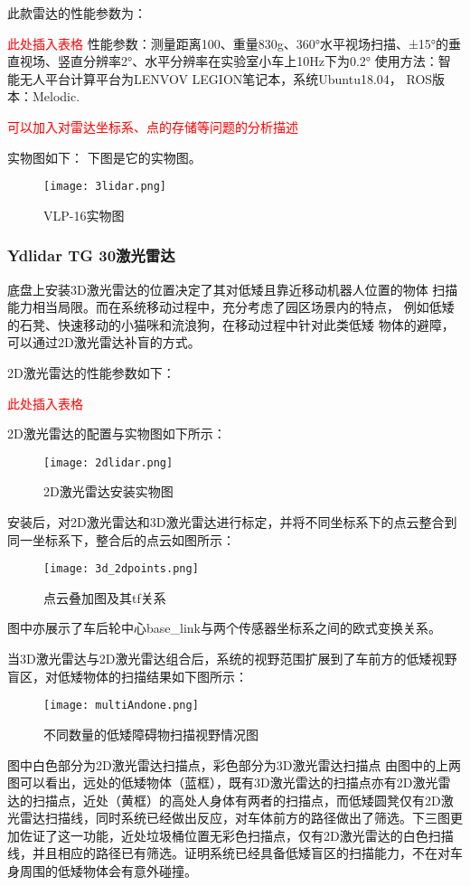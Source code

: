此款雷达的性能参数为：

\textcolor{red}{此处插入表格}
性能参数：测量距离100、重量830g、360°水平视场扫描、±15°的垂直视场、竖直分辨率2°、水平分辨率在实验室小车上10Hz下为0.2°
使用方法：智能无人平台计算平台为LENVOV LEGION笔记本，系统Ubuntu18.04， ROS版本：Melodic.

\textcolor{red}{可以加入对雷达坐标系、点的存储等问题的分析描述}

实物图如下：
下图是它的实物图。

\begin{figure}[ht]
    \centering
    \texttt{[image: 3lidar.png]}
    \caption{VLP-16实物图}
\end{figure}

\subsubsection{Ydlidar TG 30激光雷达}
底盘上安装3D激光雷达的位置决定了其对低矮且靠近移动机器人位置的物体
扫描能力相当局限。而在系统移动过程中，充分考虑了园区场景内的特点，
例如低矮的石凳、快速移动的小猫咪和流浪狗，在移动过程中针对此类低矮
物体的避障，可以通过2D激光雷达补盲的方式。

2D激光雷达的性能参数如下：

\textcolor{red}{此处插入表格}

2D激光雷达的配置与实物图如下所示：

\begin{figure}[ht]
    \centering
    \texttt{[image: 2dlidar.png]}
    \caption{2D激光雷达安装实物图}
\end{figure}
安装后，对2D激光雷达和3D激光雷达进行标定，并将不同坐标系下的点云整合到同一坐标系下，整合后的点云如图所示：
\begin{figure}[ht]
    \centering
    \texttt{[image: 3d\_2dpoints.png]}
    \caption{点云叠加图及其tf关系}
\end{figure}
图中亦展示了车后轮中心base\_link与两个传感器坐标系之间的欧式变换关系。

当3D激光雷达与2D激光雷达组合后，系统的视野范围扩展到了车前方的低矮视野盲区，对低矮物体的扫描结果如下图所示：
\begin{figure}[ht]
    \centering
    \texttt{[image: multiAndone.png]}
    \caption{不同数量的低矮障碍物扫描视野情况图}
\end{figure}
图中白色部分为2D激光雷达扫描点，彩色部分为3D激光雷达扫描点 由图中的上两图可以看出，远处的低矮物体（蓝框），既有3D激光雷达的扫描点亦有2D激光雷达的扫描点，近处（黄框）的高处人身体有两者的扫描点，而低矮圆凳仅有2D激光雷达扫描线，同时系统已经做出反应，对车体前方的路径做出了筛选。下三图更加佐证了这一功能，近处垃圾桶位置无彩色扫描点，仅有2D激光雷达的白色扫描线，并且相应的路径已有筛选。证明系统已经具备低矮盲区的扫描能力，不在对车身周围的低矮物体会有意外碰撞。

